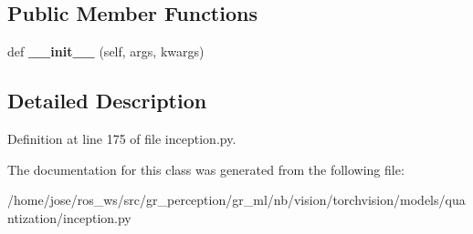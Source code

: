 \subsection*{Public Member Functions}
\begin{DoxyCompactItemize}
\item 
\mbox{\label{classtorchvision_1_1models_1_1quantization_1_1inception_1_1QuantizableInceptionAux_a6e86f92443375b4abea5d35dc62ae279}} 
def {\bfseries \+\_\+\+\_\+init\+\_\+\+\_\+} (self, args, kwargs)
\end{DoxyCompactItemize}


\subsection{Detailed Description}


Definition at line 175 of file inception.\+py.



The documentation for this class was generated from the following file\+:\begin{DoxyCompactItemize}
\item 
/home/jose/ros\+\_\+ws/src/gr\+\_\+perception/gr\+\_\+ml/nb/vision/torchvision/models/quantization/inception.\+py\end{DoxyCompactItemize}

